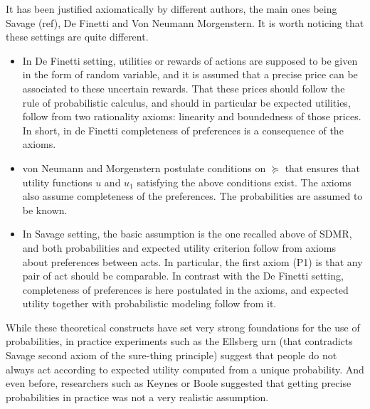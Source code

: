 \documentclass[french, english]{llncs}
\begin{document}
	It has been justified axiomatically by different authors, the main ones being Savage (ref), De Finetti and Von Neumann Morgenstern. It is worth noticing that these settings are quite different.
	\begin{itemize}
		\item In De Finetti setting, utilities or rewards of actions are supposed to be given in the form of random variable, and it is assumed that a precise price can be associated to these uncertain rewards. That these prices should follow the rule of probabilistic calculus, and should in particular be expected utilities, follow from two rationality axioms: linearity and boundedness of those prices. In short, in de Finetti completeness of preferences is a consequence of the axioms. 
		\item von Neumann and Morgenstern postulate conditions on $\succeq$ that ensures that utility functions $u$ and $u_1$ satisfying the above conditions exist. The axioms also assume completeness of the preferences. The probabilities are assumed to be known.
		\item In Savage setting, the basic assumption is the one recalled above of SDMR, and both probabilities and expected utility criterion follow from axioms about preferences between acts. In particular, the first axiom (P1) is that any pair of act should be comparable. In contrast with the De Finetti setting, completeness of preferences is here postulated in the axioms, and expected utility together with probabilistic modeling follow from it. 
	\end{itemize}
	While these theoretical constructs have set very strong foundations for the use of probabilities, in practice experiments such as the Ellsberg urn (that contradicts Savage second axiom of the sure-thing principle) suggest that people do not always act according to expected utility computed from a unique probability. And even before, researchers such as Keynes or Boole suggested that getting precise probabilities in practice was not a very realistic assumption. 
	
\end{document}
